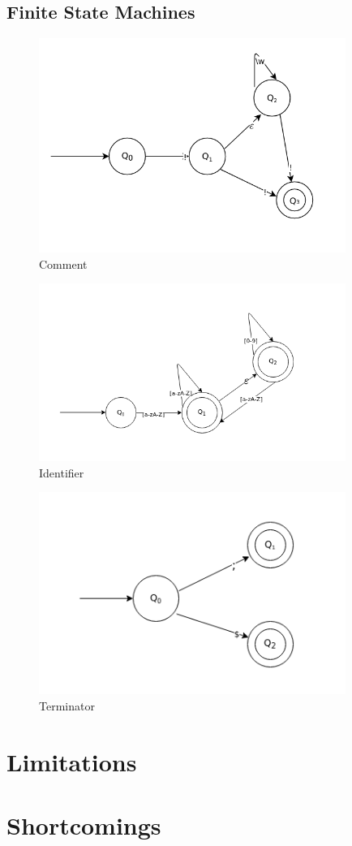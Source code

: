 \documentclass{article}
\begin{document}
\newpage

    \subsection{Finite State Machines}
        \begin{figure}[!hbtp]
            \centering
            \includegraphics[width=10cm]{Comment-FSM.png}
            \caption{Comment}
        \end{figure}

       \begin{figure}[!hbtp]
            \centering
            \includegraphics[width=10cm]{Identifier.png}
            \caption{Identifier}
        \end{figure}

       \begin{figure}[!hbtp]
            \centering
            \includegraphics[width=10cm]{Terminators.png}
            \caption{Terminator}
        \end{figure}

\newpage

\section{Limitations}
\section{Shortcomings}
\end{document}

